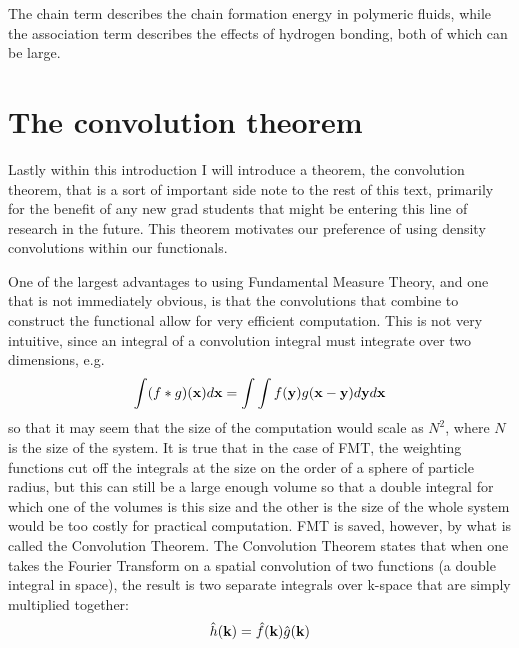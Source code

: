 The chain
term describes the chain formation energy in polymeric fluids, while
the association term describes the effects of hydrogen bonding, both
of which can be large.

\clearpage
\newpage

\section{The convolution theorem}

Lastly within this introduction I will introduce a theorem, the
convolution theorem, that is a sort of important side note to the rest
of this text, primarily for the benefit of any new grad students that
might be entering this line of research in the future.  This theorem
motivates our preference of using density convolutions within our
functionals.

One of the largest advantages to using Fundamental
Measure Theory, and one that is not immediately obvious, is that the
convolutions that combine to construct the functional allow for very
efficient computation.  This is not very intuitive, since an integral
of a convolution integral must integrate over two dimensions, e.g.
\begin{align}
\int(f\ast g)(\textbf{x})d\textbf{x} = \int \int f(\textbf{y})g(\textbf{x}-\textbf{y})d\textbf{y} d\textbf{x}
\end{align}
so that it may seem that the size of the computation would scale as
$N^2$, where $N$ is the size of the system.  It is true that in the
case of FMT, the weighting functions cut off the integrals at the size
on the order of a sphere of particle radius, but this can still be a
large enough volume so that a double integral for which one of the
volumes is this size and the other is the size of the whole system
would be too costly for practical computation.  FMT is saved, however,
by what is called the Convolution Theorem.  The Convolution Theorem
states that when one takes the Fourier Transform on a spatial
convolution of two functions (a double integral in space), the result
is two separate integrals over k-space that are simply multiplied
together:
\begin{align}
\hat{h}(\textbf{k}) = \hat{f}(\textbf{k})\hat{g}(\textbf{k})
\end{align}

